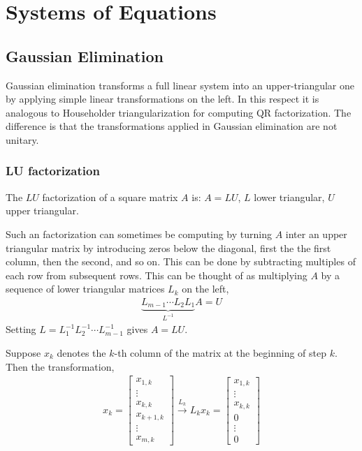 \documentclass[12pt]{article}
\begin{document}
\section{Systems of Equations}

\subsection{Gaussian Elimination}
Gaussian elimination transforms a full linear system into an upper-triangular one by applying simple linear transformations on the left. In this respect it is analogous to Householder triangularization for computing QR factorization. The difference is that the transformations applied in Gaussian elimination are not unitary.

\subsubsection{LU factorization}

\begin{definition}[LU factorization]
The \( LU \) factorization of a square matrix \( A \) is: \( A = LU \), \( L \) lower triangular, \( U \) upper triangular.
\end{definition}

Such an factorization can sometimes be computing by turning \( A \) inter an upper triangular matrix by introducing zeros below the diagonal, first the the first column, then the second, and so on.  This can be done by subtracting multiples of each row from subsequent rows. This can be thought of as multiplying \( A \) by a sequence of lower triangular matrices \( L_k \) on the left,
\begin{align*}
    \underbrace{L_{m-1}\cdots L_2L_1}_{L^{-1}} A = U
\end{align*}
Setting \( L = L_1^{-1}L_2^{-1}\cdots L_{m-1}^{-1} \) gives \( A = LU \).

Suppose \( x_k \) denotes the \( k \)-th column of the matrix at the beginning of step \( k \). Then the transformation,
\begin{align*}
    x_k = \left[\begin{array}{c}x_{1,k} \\ \vdots \\ x_{k,k} \\ x_{k+1,k} \\ \vdots\\ x_{m,k}\end{array}\right] \xrightarrow{L_k} L_kx_k = \left[\begin{array}{c}x_{1,k} \\ \vdots \\ x_{k,k} \\ 0 \\ \vdots\\ 0\end{array}\right]
\end{align*}
\end{document}
